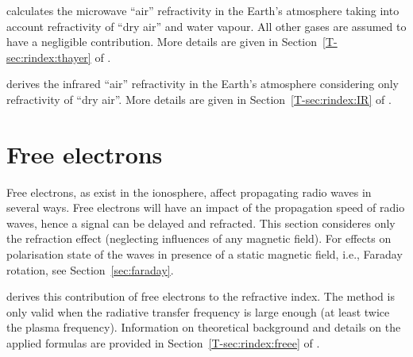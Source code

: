  calculates the microwave ``air''
refractivity in the Earth's atmosphere taking into account refractivity of
``dry air'' and water vapour. All other gases are assumed to have a negligible
contribution. More details are given in Section~\ref{T-sec:rindex:thayer} of
\theory.

 derives the infrared ``air'' refractivity in the
Earth's atmosphere considering only refractivity of ``dry air''. More details
are given in Section~\ref{T-sec:rindex:IR} of \theory.

\section{Free electrons}
 \label{sec:rindex:freee}
%
Free electrons, as exist in the ionosphere, affect propagating radio waves
in several ways. Free electrons will have an impact of the propagation speed of
radio waves, hence a signal can be delayed and refracted. This section
consideres only the refraction effect (neglecting influences of any magnetic
field). For effects on polarisation state of the
waves in presence of a static magnetic field, i.e., Faraday rotation, see
Section~\ref{sec:faraday}.

 derives this contribution of free
electrons to the refractive index. The method is only valid when the radiative
transfer frequency is large enough (at least twice the plasma frequency).
Information on theoretical background and details on the applied formulas are
provided in Section~\ref{T-sec:rindex:freee} of \theory.


